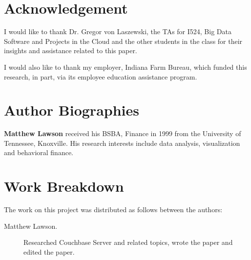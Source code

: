 \documentclass[9pt,twocolumn,twoside]{styles/osajnl}
\begin{document}
\section{Acknowledgement}

I would like to thank Dr. Gregor von Laszewski, the TAs for I524, Big Data Software and Projects in the Cloud and the other students in the class for their insights and assistance related to this paper.

I would also like to thank my employer, Indiana Farm Bureau, which funded this research, in part, via its employee education assistance program.



 
\section*{Author Biographies}
\begingroup
\setlength\intextsep{0pt}
\begin{minipage}[t][3.2cm][t]{1.0\columnwidth} %
  \noindent
  {\bfseries Matthew Lawson} received his BSBA, Finance in 1999 from
  the University of Tennessee, Knoxville. His research interests include
  data analysis, visualization and behavioral finance.
\end{minipage}
\endgroup


\appendix

\section{Work Breakdown}

The work on this project was distributed as follows between the
authors:

\begin{description}
\item[Matthew Lawson.] Researched Couchbase Server and related topics, wrote the paper and edited the paper.
\end{description}
\end{document}
